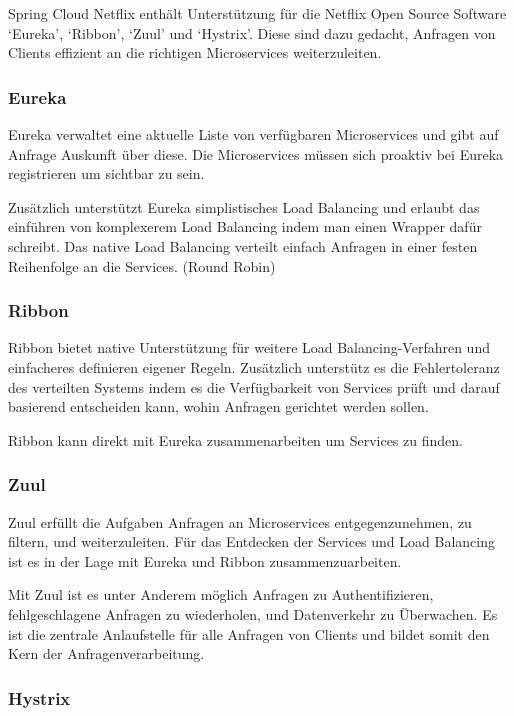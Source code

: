 \documentclass{article}
\begin{document}
Spring Cloud Netflix enthält Unterstützung für die Netflix Open Source Software `Eureka', `Ribbon', `Zuul' und `Hystrix'.
Diese sind dazu gedacht, Anfragen von Clients effizient an die richtigen Microservices weiterzuleiten.

\subsubsection{Eureka}

Eureka verwaltet eine aktuelle Liste von verfügbaren Microservices und gibt auf Anfrage Auskunft über diese.
Die Microservices müssen sich proaktiv bei Eureka registrieren um sichtbar zu sein.

Zusätzlich unterstützt Eureka simplistisches Load Balancing und erlaubt das einführen von komplexerem Load Balancing indem man einen Wrapper dafür schreibt.
Das native Load Balancing verteilt einfach Anfragen in einer festen Reihenfolge an die Services. (Round Robin)

\subsubsection{Ribbon}

Ribbon bietet native Unterstützung für weitere Load Balancing-Verfahren und einfacheres definieren eigener Regeln.
Zusätzlich unterstütz es die Fehlertoleranz des verteilten Systems indem es die Verfügbarkeit von Services prüft und darauf basierend entscheiden kann, wohin Anfragen gerichtet werden sollen.

Ribbon kann direkt mit Eureka zusammenarbeiten um Services zu finden.

\subsubsection{Zuul}

Zuul erfüllt die Aufgaben Anfragen an Microservices entgegenzunehmen, zu filtern, und weiterzuleiten.
Für das Entdecken der Services und Load Balancing ist es in der Lage mit Eureka und Ribbon zusammenzuarbeiten.

Mit Zuul ist es unter Anderem möglich Anfragen zu Authentifizieren, fehlgeschlagene Anfragen zu wiederholen, und Datenverkehr zu Überwachen.
Es ist die zentrale Anlaufstelle für alle Anfragen von Clients und bildet somit den Kern der Anfragenverarbeitung.

\subsubsection{Hystrix}
\end{document}
